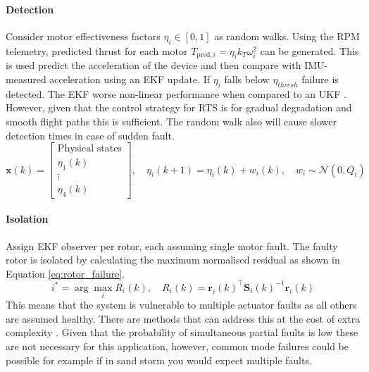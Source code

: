 \paragraph{Detection}
Consider motor effectiveness factors $\eta_i \in [0,1]$ as random walks. Using the \gls{RPM} telemetry, predicted thrust for each motor $T_{\text{pred},i} = \eta_i k_T \omega_i^2$ can be generated. This is used predict the acceleration of the device and then compare with IMU-measured acceleration using an \gls{EKF} update. If $\eta_i$ falls below $\eta_{thresh}$ failure is detected. The \gls{EKF} worse non-linear performance when compared to an \gls{UKF} \cite{WAN2000}. However, given that the control strategy for \gls{RTS} is for gradual degradation and smooth flight paths this is sufficient. The random walk also will cause slower detection times in case of sudden fault.
\begin{equation}
    \mathbf{x}(k) = \begin{bmatrix}
        \text{Physical states} \\
        \eta_1(k) \\
        \vdots \\
        \eta_4(k)
    \end{bmatrix}, \quad
    \eta_i(k+1) = \eta_i(k) + w_i(k), \quad w_i \sim \mathcal{N}(0,Q_i)
\end{equation}
\paragraph{Isolation}
Assign \gls{EKF} observer per rotor, each assuming single motor fault. The faulty rotor is isolated by calculating the maximum normalised residual as shown in Equation \ref{eq:rotor_failure}.
\begin{equation}\label{eq:rotor_failure}
    i^* = \arg\max_i R_i(k), \quad R_i(k) = \mathbf{r}_i(k)^\top \mathbf{S}_i(k)^{-1} \mathbf{r}_i(k)
\end{equation}
This means that the system is vulnerable to multiple actuator faults as all others are assumed healthy. There are methods that can address this at the cost of extra complexity \cite{ZHANG2008}. Given that the probability of simultaneous partial faults is low these are not necessary for this application, however, common mode failures could be possible for example if in sand storm you would expect multiple faults.
